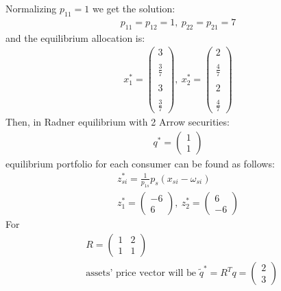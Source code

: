 \documentclass[a4paper]{article}
\begin{document}
Normalizing $p_{11} = 1$ we get the solution:
\begin{align*}
p_{11} = p_{12} = 1,\ p_{22} = p_{21} = 7
\end{align*}
and the equilibrium allocation is:
\begin{align*}
x_1^* = \begin{pmatrix}
3\\
\\
\frac{3}{7}\\
\\
3\\
\\
\frac{3}{7}
\end{pmatrix},\ x_2^* = \begin{pmatrix}
2\\
\\
\frac{4}{7}\\
\\
2\\
\\
\frac{4}{7}
\end{pmatrix}
\end{align*}
Then, in Radner equilibrium with 2 Arrow securities:
\begin{align*}
q^* = \begin{pmatrix}
1\\
1
\end{pmatrix}
\end{align*}
equilibrium portfolio for each consumer can be found as follows: 
\begin{align*}
z^*_{si} = \frac{1}{p_{1s}}p_s(x_{si} - \omega_{si})\\
z^*_{1} =  \begin{pmatrix}
-6\\
6
\end{pmatrix},\ z^*_{2} = \begin{pmatrix}
6\\
-6
\end{pmatrix}
\end{align*}
For
\begin{align*}
&R = \begin{pmatrix}
1 & 2\\
1 & 1
\end{pmatrix}\\
&\text{assets' price vector will be }\tilde{q}^* = R^Tq = \begin{pmatrix}
2\\
3
\end{pmatrix}
\end{align*}
\end{document}
